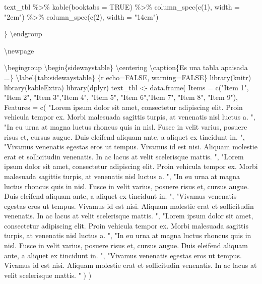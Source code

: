 \documentclass[11pt,a4paper,oneside,]{article}
\newenvironment{Shaded}{\begin{snugshade}}{\end{snugshade}}
\newcommand{\AttributeTok}[1]{\textcolor[rgb]{0.77,0.63,0.00}{#1}}
\newcommand{\NormalTok}[1]{#1}
\newcommand{\SpecialCharTok}[1]{\textcolor[rgb]{0.00,0.00,0.00}{#1}}
\newcommand{\StringTok}[1]{\textcolor[rgb]{0.31,0.60,0.02}{#1}}
\numberwithin{dummy}{section}
\theoremstyle{ocrenumbox}
\theoremstyle{blacknumex}
\theoremstyle{blacknumbox}
\theoremstyle{ocrenum}
\theoremstyle{ocrenum}
\begin{document}
\begin{Shaded}
\begin{Highlighting}[numbers=left,,firstnumber=701,]
\AttributeTok{text\_tbl \%\textgreater{}\%}
\AttributeTok{  kable(booktabs = TRUE) \%\textgreater{}\% }
\AttributeTok{      column\_spec(c(1), width = "2cm") \%\textgreater{}\% }
\AttributeTok{      column\_spec(c(2), width = "14cm")}

\StringTok{\textasciigrave{}\textasciigrave{}\textasciigrave{}}
\NormalTok{\}}
\NormalTok{\textbackslash{}endgroup}

\NormalTok{\textbackslash{}newpage}



\NormalTok{\textbackslash{}begingroup}
\NormalTok{\textbackslash{}begin\{sidewaystable\}}
\NormalTok{\textbackslash{}centering}
\NormalTok{\textbackslash{}caption\{Es una tabla apaisada ...\} \textbackslash{}label\{tab}\SpecialCharTok{:}\NormalTok{sidewaystable\}}
\StringTok{\textasciigrave{}\textasciigrave{}\textasciigrave{}}\AttributeTok{\{r echo=FALSE, warning=FALSE\}}
\AttributeTok{library(knitr)}
\AttributeTok{library(kableExtra)}
\AttributeTok{library(dplyr)}
\AttributeTok{text\_tbl \textless{}{-} data.frame(}
\AttributeTok{  Items = c("Item 1", "Item 2", "Item 3","Item 4", "Item 5", "Item 6","Item 7", "Item 8", "Item 9"), }
\AttributeTok{  Features = c(}
\AttributeTok{    "Lorem ipsum dolor sit amet, consectetur adipiscing elit.}
\AttributeTok{    Proin vehicula tempor ex. Morbi malesuada sagittis turpis,}
\AttributeTok{    at venenatis nisl luctus a. ",}
\AttributeTok{    "In eu urna at magna luctus rhoncus quis in nisl. Fusce in velit}
\AttributeTok{    varius, posuere risus et, cursus augue. Duis eleifend aliquam ante,}
\AttributeTok{    a aliquet ex tincidunt in. ",}
\AttributeTok{    "Vivamus venenatis egestas eros ut tempus. Vivamus id est nisi.}
\AttributeTok{    Aliquam molestie erat et sollicitudin venenatis. In ac lacus at}
\AttributeTok{    velit scelerisque mattis. ",}
\AttributeTok{    "Lorem ipsum dolor sit amet, consectetur adipiscing elit.}
\AttributeTok{    Proin vehicula tempor ex. Morbi malesuada sagittis turpis,}
\AttributeTok{    at venenatis nisl luctus a. ",}
\AttributeTok{    "In eu urna at magna luctus rhoncus quis in nisl. Fusce in velit}
\AttributeTok{    varius, posuere risus et, cursus augue. Duis eleifend aliquam ante,}
\AttributeTok{    a aliquet ex tincidunt in. ",}
\AttributeTok{    "Vivamus venenatis egestas eros ut tempus. Vivamus id est nisi.}
\AttributeTok{    Aliquam molestie erat et sollicitudin venenatis. In ac lacus at}
\AttributeTok{    velit scelerisque mattis. ",}
\AttributeTok{    "Lorem ipsum dolor sit amet, consectetur adipiscing elit.}
\AttributeTok{    Proin vehicula tempor ex. Morbi malesuada sagittis turpis,}
\AttributeTok{    at venenatis nisl luctus a. ",}
\AttributeTok{    "In eu urna at magna luctus rhoncus quis in nisl. Fusce in velit}
\AttributeTok{    varius, posuere risus et, cursus augue. Duis eleifend aliquam ante,}
\AttributeTok{    a aliquet ex tincidunt in. ",}
\AttributeTok{    "Vivamus venenatis egestas eros ut tempus. Vivamus id est nisi.}
\AttributeTok{    Aliquam molestie erat et sollicitudin venenatis. In ac lacus at}
\AttributeTok{    velit scelerisque mattis. "}
\AttributeTok{    ) }
\AttributeTok{  )}


\end{Highlighting}
\end{Shaded}
\end{document}
